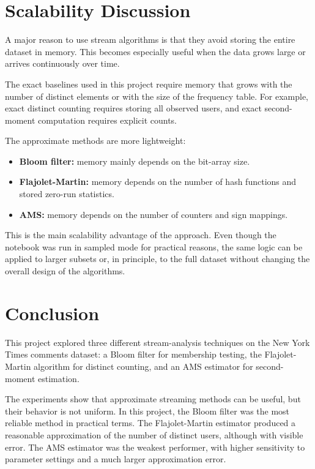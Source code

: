 \documentclass[11pt,a4paper]{article}
\begin{document}
\section{Scalability Discussion}

A major reason to use stream algorithms is that they avoid storing the entire dataset in memory. This becomes especially useful when the data grows large or arrives continuously over time.

The exact baselines used in this project require memory that grows with the number of distinct elements or with the size of the frequency table. For example, exact distinct counting requires storing all observed users, and exact second-moment computation requires explicit counts.

The approximate methods are more lightweight:
\begin{itemize}
    \item \textbf{Bloom filter:} memory mainly depends on the bit-array size.
    \item \textbf{Flajolet-Martin:} memory depends on the number of hash functions and stored zero-run statistics.
    \item \textbf{AMS:} memory depends on the number of counters and sign mappings.
\end{itemize}

This is the main scalability advantage of the approach. Even though the notebook was run in sampled mode for practical reasons, the same logic can be applied to larger subsets or, in principle, to the full dataset without changing the overall design of the algorithms.

\section{Conclusion}

This project explored three different stream-analysis techniques on the New York Times comments dataset: a Bloom filter for membership testing, the Flajolet-Martin algorithm for distinct counting, and an AMS estimator for second-moment estimation.

The experiments show that approximate streaming methods can be useful, but their behavior is not uniform. In this project, the Bloom filter was the most reliable method in practical terms. The Flajolet-Martin estimator produced a reasonable approximation of the number of distinct users, although with visible error. The AMS estimator was the weakest performer, with higher sensitivity to parameter settings and a much larger approximation error.
\end{document}
